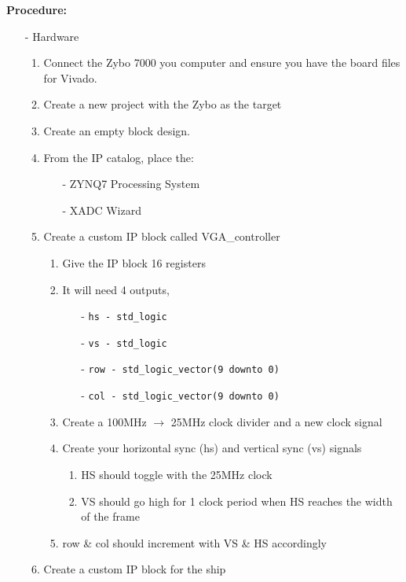 \documentclass[12pt]{article}
\begin{document}
	\noindent \textbf{Procedure:}
	\begin{itemize}[noitemsep, nolistsep]
	\item[-] Hardware	
		\begin{enumerate}
			\item Connect the Zybo 7000 you computer and ensure you have the board files for Vivado.
			\item Create a new project with the Zybo as the target
			\item Create an empty block design.
			\item From the IP catalog, place the:
				\begin{itemize}[noitemsep, nolistsep]
					\item[-] ZYNQ7 Processing System
					\item[-] XADC Wizard
				\end{itemize}
			\item Create a custom IP block called VGA\_controller 
				\begin{enumerate}
					\item Give the IP block 16 registers
					\item It will need 4 outputs,
						\begin{itemize}[noitemsep, nolistsep]
							\item[-] \texttt{hs - std\_logic}
							\item[-] \texttt{vs - std\_logic}
							\item[-] \texttt{row - std\_logic\_vector(9 downto 0)}
							\item[-] \texttt{col - std\_logic\_vector(9 downto 0)}
						\end{itemize}
					\item Create a 100MHz $\rightarrow$ 25MHz clock divider and a new clock signal
					\item Create your horizontal sync (hs) and vertical sync (vs) signals
						\begin{enumerate}
							\item HS should toggle with the 25MHz clock
							\item VS should go high for 1 clock period when HS reaches the width of the frame
						\end{enumerate}
					\item row \& col should increment with VS \& HS accordingly
				\end{enumerate}
			\item Create a custom IP block for the ship

\end{enumerate}
\end{itemize}
\end{document}

